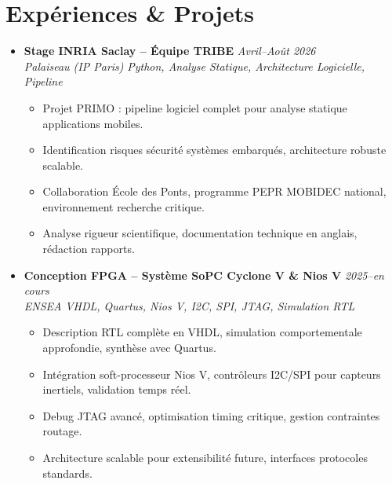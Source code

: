 \documentclass[a4paper,11pt]{article}
\begin{document}
\section{Exp\'eriences \& Projets}
\begin{itemize}[leftmargin=*, label={-}]
    \item \textbf{Stage INRIA Saclay -- \'Equipe TRIBE} \hfill \textit{Avril--Ao\^ut 2026} \\
    \textit{Palaiseau (IP Paris)} \hfill \textit{Python, Analyse Statique, Architecture Logicielle, Pipeline}
    \vspace{-2pt}
        \begin{itemize}[leftmargin=0.4cm, nosep, label=\tiny$\bullet$]
            \item \small{Projet PRIMO : pipeline logiciel complet pour analyse statique applications mobiles.}
            \item \small{Identification risques s\'ecurit\'e syst\`emes embarqu\'es, architecture robuste scalable.}
            \item \small{Collaboration \'Ecole des Ponts, programme PEPR MOBIDEC national, environnement recherche critique.}
            \item \small{Analyse rigueur scientifique, documentation technique en anglais, rédaction rapports.}
        \end{itemize}
    \vspace{3pt}
    \item \textbf{Conception FPGA -- Syst\`eme SoPC Cyclone V \& Nios V} \hfill \textit{2025--en cours} \\
    \textit{ENSEA} \hfill \textit{VHDL, Quartus, Nios V, I2C, SPI, JTAG, Simulation RTL}
    \vspace{-2pt}
        \begin{itemize}[leftmargin=0.4cm, nosep, label=\tiny$\bullet$]
            \item \small{Description RTL compl\`ete en VHDL, simulation comportementale approfondie, synth\`ese avec Quartus.}
            \item \small{Intégration soft-processeur Nios V, contrôleurs I2C/SPI pour capteurs inertiels, validation temps r\'eel.}
            \item \small{Debug JTAG avanc\'e, optimisation timing critique, gestion contraintes routage.}
            \item \small{Architecture scalable pour extensibilité future, interfaces protocoles standards.}
        \end{itemize}

\end{itemize}
\end{document}
